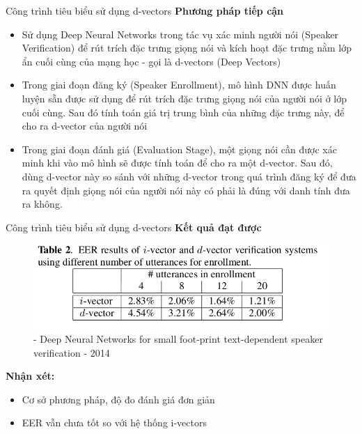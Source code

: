 \documentclass[notheorems, aspectratio=54]{beamer}
\begin{document}
\begin{frame}{Công trình tiêu biểu sử dụng d-vectors}
	\textbf{Phương pháp tiếp cận}
	\begin{itemize}
		\item Sử dụng Deep Neural Networks trong tác vụ xác minh người nói (Speaker Verification) để rút trích đặc trưng giọng nói và kích hoạt đặc trưng nằm lớp ẩn cuối cùng của mạng học - gọi là d-vectors (Deep Vectors)
		\item Trong giai đoạn đăng ký (Speaker Enrollment), mô hình DNN được huấn luyện sẵn được sử dụng để rút trích đặc trưng giọng nói của người nói ở lớp cuối cùng. Sau đó tính toán giá trị trung bình của những đặc trưng này, để cho ra d-vector của người nói
		\item 	Trong giai đoạn đánh giá (Evaluation Stage), một giọng nói cần được xác minh khi vào mô hình sẽ được tính toán để cho ra một d-vector. Sau đó, dùng d-vector này so sánh với những d-vector trong quá trình đăng ký để đưa ra quyết định giọng nói của người nói này có phải là đúng với danh tính đưa ra không.
	\end{itemize}
\end{frame}
\begin{frame}{Công trình tiêu biểu sử dụng d-vectors}
	\textbf{Kết quả đạt được}
	\begin{figure}[H]
		\centering
		\includegraphics[width=0.75\linewidth]{images/d-vectors-result-table-02.png}
		\caption{- Deep Neural Networks for small foot-print text-dependent speaker verification - 2014}
		\label{fig:writing-thesis}
	\end{figure}
	\textbf{Nhận xét:}
	\begin{itemize}
		\item Cơ sở phương pháp, độ đo đánh giá đơn giản
		\item EER vẫn chưa tốt so với hệ thống i-vectors
	\end{itemize}
\end{frame}
\end{document}
